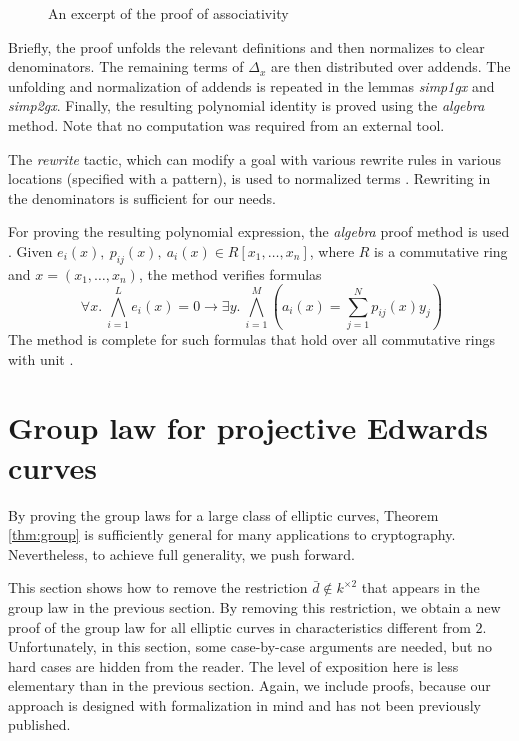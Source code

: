 \documentclass{llncs}
\begin{document}
\begin{figure}
	{}
	\caption{An excerpt of the proof of associativity}
	\label{fig:2}
\end{figure}

Briefly, the proof unfolds the relevant definitions and then
normalizes to clear denominators. The remaining terms of $\Delta_x$
are then distributed over addends. The unfolding and normalization of
addends is repeated in the lemmas \textit{simp1gx} and
\textit{simp2gx}. Finally, the resulting polynomial identity is proved
using the \textit{algebra} method.  Note that no computation was
required from an external tool.

The \emph{rewrite} tactic, which can modify a goal with various
rewrite rules in various locations (specified with a pattern), is
used to normalized terms \cite{noschinskipattern}.  Rewriting
in the denominators is sufficient for our needs.

For proving the resulting polynomial expression, the \textit{algebra}
proof method is used \cite{chaieb2007context}
\cite{chaieb2008automated} \cite{wenzel2019isabelle}.  Given
$e_i(x),\ p_{ij}(x),\ a_i(x) \in R[x_1,\ldots,x_n]$, where $R$ is a
commutative ring and $x=(x_1,\ldots,x_n)$, the method verifies
formulas
\[
\; \forall x.\ \bigwedge_{i = 1}^L
e_i({x}) = 0 \to \exists{y}.\ \bigwedge_{i = 1}^M
\left(a_i(x) = \sum_{j = 1}^N p_{ij}({x}) y_j \right)
\] 
The method is complete for such formulas that hold over all
commutative rings with unit \cite{harrison2007automating}.

\section{Group law for projective Edwards curves}\label{sec:proj}

By proving the group laws for a large class of elliptic curves,
Theorem \ref{thm:group} is sufficiently general for many applications
to cryptography.  Nevertheless, to achieve full generality, we
push forward.

This section shows how to remove the restriction $\bar d\not\in
k^{\times 2}$ that appears in the group law in the previous section.
By removing this restriction, we obtain a new proof of the group law
for all elliptic curves in characteristics different from $2$.
Unfortunately, in this section, some case-by-case arguments are
needed, but no hard cases are hidden from the reader.  The level of
exposition here is less elementary than in the previous section.
Again, we include proofs, because our approach is designed with
formalization in mind and has not been previously published.
\end{document}
